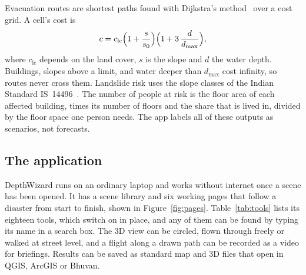 \documentclass[11pt,a4paper]{article}
\begin{document}
Evacuation routes are shortest paths found with Dijkstra's method~\cite{dijkstra1959} over a cost grid. A cell's cost is
\begin{equation}
c = c_{\mathrm{lc}} \Bigl(1 + \frac{s}{s_0}\Bigr)\Bigl(1 + 3\,\frac{d}{d_{\max}}\Bigr),
\label{eq:cost}
\end{equation}
where $c_{\mathrm{lc}}$ depends on the land cover, $s$ is the slope and $d$ the water depth. Buildings, slopes above a limit, and water deeper than $d_{\max}$ cost infinity, so routes never cross them. Landslide risk uses the slope classes of the Indian Standard IS~14496~\cite{bis14496}. The number of people at risk is the floor area of each affected building, times its number of floors and the share that is lived in, divided by the floor space one person needs. The app labels all of these outputs as scenarios, not forecasts.

\subsection{The application}
DepthWizard runs on an ordinary laptop and works without internet once a scene has been opened. It has a scene library and six working pages that follow a disaster from start to finish, shown in Figure~\ref{fig:pages}. Table~\ref{tab:tools} lists its eighteen tools, which switch on in place, and any of them can be found by typing its name in a search box. The 3D view can be circled, flown through freely or walked at street level, and a flight along a drawn path can be recorded as a video for briefings. Results can be saved as standard map and 3D files that open in QGIS, ArcGIS or Bhuvan.
\end{document}
